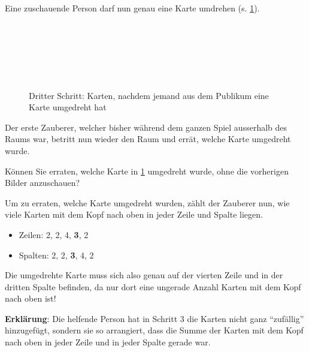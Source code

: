 Eine zuschauende Person darf nun genau eine Karte umdrehen (s. \cref{fig:zauberer-3}).
\begin{figure}[H]
    \centering
    \\
    \\
    \\
    \\
    \\
    \caption{Dritter Schritt: Karten, nachdem jemand aus dem Publikum eine Karte umgedreht hat}
    \label{fig:zauberer-3}
\end{figure}
Der erste Zauberer, welcher bisher während dem ganzen Spiel ausserhalb des Raums war, betritt nun wieder den Raum und errät, welche Karte umgedreht wurde.

\begin{mychallenge}
    Können Sie erraten, welche Karte in \cref{fig:zauberer-3} umgedreht wurde, ohne die vorherigen Bilder anzuschauen?
\end{mychallenge}

Um zu erraten, welche Karte umgedreht wurden, zählt der Zauberer nun, wie viele Karten mit dem Kopf nach oben in jeder Zeile und Spalte liegen.
\begin{itemize}
    \item Zeilen: 2, 2, 4, \textbf{3}, 2
    \item Spalten: 2, 2, \textbf{3}, 4, 2
\end{itemize}

Die umgedrehte Karte muss sich also genau auf der vierten Zeile und in der dritten Spalte befinden, da nur dort eine ungerade Anzahl Karten mit dem Kopf nach oben ist!

\textbf{Erklärung}: Die helfende Person hat in Schritt 3 die Karten nicht ganz \enquote{zufällig} hinzugefügt, sondern sie so arrangiert, dass die Summe der Karten mit dem Kopf nach oben in jeder Zeile und in jeder Spalte gerade war.

